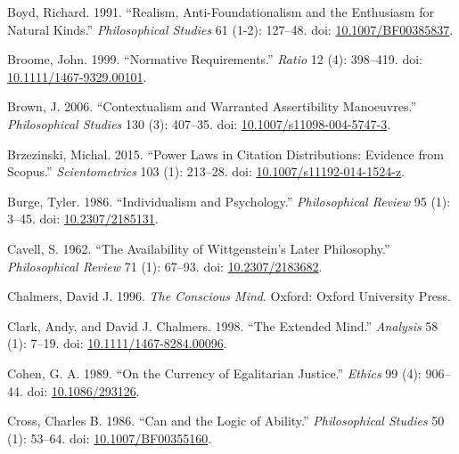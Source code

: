 \documentclass[
  10pt,
  letterpaper,
  DIV=11,
  numbers=noendperiod,
  twoside]{scrartcl}
\newlength{\cslhangindent}
\newenvironment{CSLReferences}[2] %
 {\begin{list}{}{%
  \setlength{\itemindent}{0pt}
  \setlength{\leftmargin}{0pt}
  \setlength{\parsep}{0pt}
  \ifodd #1
   \setlength{\leftmargin}{\cslhangindent}
   \setlength{\itemindent}{-1\cslhangindent}
  \fi
  \setlength{\itemsep}{#2\baselineskip}}}
 {\end{list}}
\begin{document}
\begin{CSLReferences}{1}{0}
Boyd, Richard. 1991. {``Realism, Anti-Foundationalism and the Enthusiasm
for Natural Kinds.''} \emph{Philosophical Studies} 61 (1-2): 127--48.
doi: \href{https://doi.org/10.1007/BF00385837}{10.1007/BF00385837}.

Broome, John. 1999. {``Normative Requirements.''} \emph{Ratio} 12 (4):
398--419. doi:
\href{https://doi.org/10.1111/1467-9329.00101}{10.1111/1467-9329.00101}.

Brown, J. 2006. {``Contextualism and Warranted Assertibility
Manoeuvres.''} \emph{Philosophical Studies} 130 (3): 407--35. doi:
\href{https://doi.org/10.1007/s11098-004-5747-3}{10.1007/s11098-004-5747-3}.

Brzezinski, Michal. 2015. {``Power Laws in Citation Distributions:
Evidence from Scopus.''} \emph{Scientometrics} 103 (1): 213--28. doi:
\href{https://doi.org/10.1007/s11192-014-1524-z}{10.1007/s11192-014-1524-z}.

Burge, Tyler. 1986. {``Individualism and Psychology.''}
\emph{Philosophical Review} 95 (1): 3--45. doi:
\href{https://doi.org/10.2307/2185131}{10.2307/2185131}.

Cavell, S. 1962. {``The Availability of Wittgenstein's Later
Philosophy.''} \emph{Philosophical Review} 71 (1): 67--93. doi:
\href{https://doi.org/10.2307/2183682}{10.2307/2183682}.

Chalmers, David J. 1996. \emph{The Conscious Mind}. Oxford: Oxford
University Press.

Clark, Andy, and David J. Chalmers. 1998. {``The Extended Mind.''}
\emph{Analysis} 58 (1): 7--19. doi:
\href{https://doi.org/10.1111/1467-8284.00096}{10.1111/1467-8284.00096}.

Cohen, G. A. 1989. {``On the Currency of Egalitarian Justice.''}
\emph{Ethics} 99 (4): 906--44. doi:
\href{https://doi.org/10.1086/293126}{10.1086/293126}.

Cross, Charles B. 1986. {``Can and the Logic of Ability.''}
\emph{Philosophical Studies} 50 (1): 53--64. doi:
\href{https://doi.org/10.1007/BF00355160}{10.1007/BF00355160}.


\end{CSLReferences}
\end{document}
